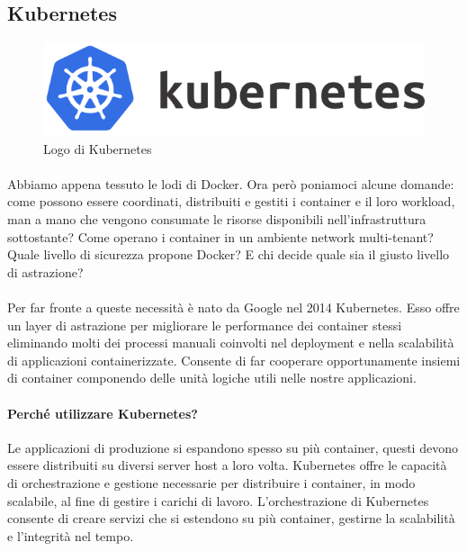 \subsection{Kubernetes}
\begin{figure}[h!]
	\centering
	\includegraphics[width=\textwidth,keepaspectratio=true]{capitoli/imgs/kubernetes_full.png}
	\caption{Logo di Kubernetes}
\end{figure}

\paragraph{}
Abbiamo appena tessuto le lodi di Docker. Ora però poniamoci alcune domande: come possono essere coordinati, distribuiti e gestiti i container e il loro workload, man a mano che vengono consumate le risorse disponibili nell'infrastruttura sottostante? Come operano i container in un ambiente network multi-tenant? Quale livello di sicurezza propone Docker? E chi decide quale sia il giusto livello di astrazione?

\paragraph{}
Per far fronte a queste necessità è nato da Google nel 2014 Kubernetes. Esso offre un layer di astrazione per migliorare le performance dei container stessi eliminando molti dei processi manuali coinvolti nel deployment e nella scalabilità di applicazioni containerizzate. Consente di far cooperare opportunamente insiemi di container componendo delle unità logiche utili nelle nostre applicazioni.

\paragraph{Perché utilizzare Kubernetes?}
Le applicazioni di produzione si espandono spesso su più container, questi devono essere distribuiti su diversi server host a loro volta. Kubernetes offre le capacità di orchestrazione e gestione necessarie per distribuire i container, in modo scalabile, al fine di gestire i carichi di lavoro. L'orchestrazione di Kubernetes consente di creare servizi che si estendono su più container, gestirne la scalabilità e l'integrità nel tempo.

